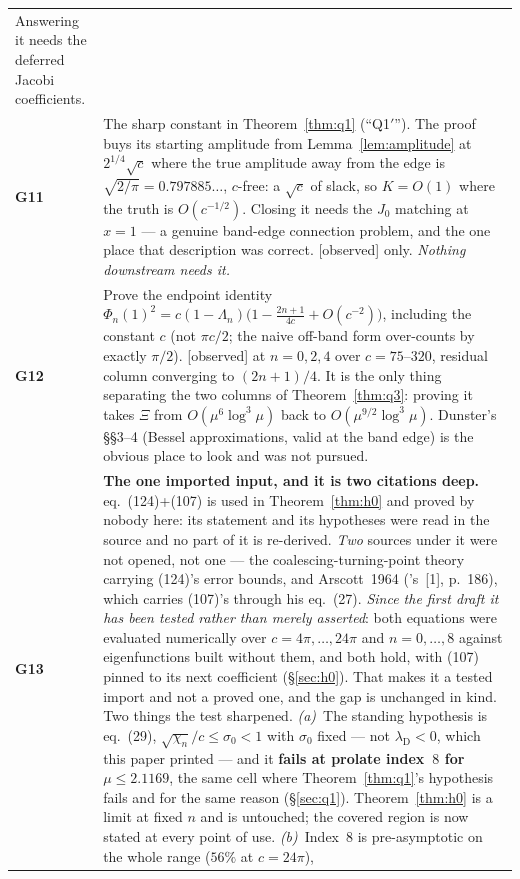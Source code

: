 \documentclass[11pt,a4paper]{article}
\theoremstyle{plain}
\theoremstyle{definition}
\theoremstyle{remark}
\newcommand{\st}[1]{{\normalfont\sffamily\footnotesize[#1]}}
\newcommand{\observed}{\st{observed}}
\begin{document}
\begin{center}
\begin{tabular}{@{}lp{}@{}}
Answering it needs the deferred Jacobi coefficients. \\
\textbf{G11} & The sharp constant in Theorem~\ref{thm:q1} (``Q1$'$'').  The
proof buys its starting amplitude from Lemma~\ref{lem:amplitude} at
$2^{1/4}\sqrt c$ where the true amplitude away from the edge is
$\sqrt{2/\pi}=0.797885\ldots$, $c$-free: a $\sqrt c$ of slack, so $K=O(1)$ where
the truth is $O(c^{-1/2})$.  Closing it needs the $J_0$ matching at $x=1$ --- a
genuine band-edge connection problem, and the one place that description was
correct.  \observed{} only.  \emph{Nothing downstream needs it.} \\
\textbf{G12} & Prove the endpoint identity
$\Phi_n(1)^2=c(1-\Lambda_n)\big(1-\frac{2n+1}{4c}+O(c^{-2})\big)$, including the
constant $c$ (not $\pi c/2$; the naive off-band form over-counts by exactly
$\pi/2$).  \observed{} at $n=0,2,4$ over $c=75$--$320$, residual column
converging to $(2n+1)/4$.  It is the only thing separating the two columns of
Theorem~\ref{thm:q3}: proving it takes $\Xi$ from $O(\mu^6\log^3\mu)$ back to
$O(\mu^{9/2}\log^3\mu)$.  Dunster's \S\S3--4 (Bessel approximations, valid at
the band edge) is the obvious place to look and was not pursued. \\
\textbf{G13} & \textbf{The one imported input, and it is two citations deep.}
\cite{Dunster2017} eq.\ (124)+(107) is used in Theorem~\ref{thm:h0} and proved
by nobody here: its statement and its hypotheses were read in the source and no
part of it is re-derived.  \emph{Two} sources under it were not opened, not one
--- the coalescing-turning-point theory carrying (124)'s error bounds, and
Arscott~1964 (\cite{Dunster2017}'s~[1], p.~186), which carries (107)'s through
his eq.~(27).  \emph{Since the first draft it has been tested rather than
merely asserted}: both equations were evaluated numerically over
$c=4\pi,\dots,24\pi$ and $n=0,\dots,8$ against eigenfunctions built without
them, and both hold, with (107) pinned to its next coefficient
(\S\ref{sec:h0}).  That makes it a tested import and not a proved one, and the
gap is unchanged in kind.  Two things the test sharpened.  \emph{(a)}~The
standing hypothesis is eq.~(29), $\sqrt{\chi_n}/c\le\sigma_0<1$ with $\sigma_0$
fixed --- not $\lambda_{\mathrm D}<0$, which this paper printed --- and it
\textbf{fails at prolate index~$8$ for $\mu\le2.1169$}, the same cell where
Theorem~\ref{thm:q1}'s hypothesis fails and for the same reason
(\S\ref{sec:q1}).  Theorem~\ref{thm:h0} is a limit at fixed $n$ and is
untouched; the covered region is now stated at every point of use.
\emph{(b)}~Index~$8$ is pre-asymptotic on the whole range ($56\%$ at $c=24\pi$),

\end{tabular}
\end{center}
\end{document}
